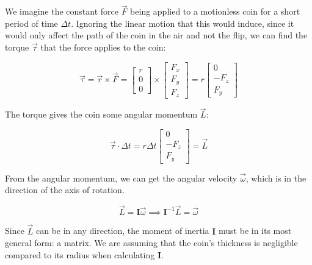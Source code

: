 \documentclass[english,12pt,a4paper,final]{article}
\begin{document}
We imagine the constant force $\vec{F}$ being applied to a motionless coin for a short period of time $\Delta t$. Ignoring the linear motion that this would induce, since it would only affect the path of the coin in the air and not the flip, we can find the torque $\vec{\tau}$ that the force applies to the coin:

\begin{equation*}
	\vec{\tau} = \vec{r}\times\vec{F} = \begin{bmatrix}r\\0\\0\end{bmatrix} \times \begin{bmatrix}F_x \\ F_y \\ F_z\end{bmatrix} = r\begin{bmatrix}0\\-F_z\\F_y\end{bmatrix}
\end{equation*}

The torque gives the coin some angular momentum $\vec{L}$:

\begin{equation*}
	\vec{\tau} \cdot \Delta t = r \Delta t\begin{bmatrix}0\\- F_z \\ F_y \end{bmatrix} = \vec{L}
\end{equation*}

From the angular momentum, we can get the angular velocity $\vec{\omega}$, which is in the direction of the axis of rotation.

\begin{equation*}
	\vec{L} = \mathbf{I} \vec{\omega} \implies \mathbf{I}^{-1} \vec{L} = \vec{\omega}
\end{equation*}

Since $\vec{L}$ can be in any direction, the moment of inertia $\mathbf{I}$ must be in its most general form: a matrix. We are assuming that the coin's thickness is negligible compared to its radius when calculating $\mathbf{I}$.
\end{document}
